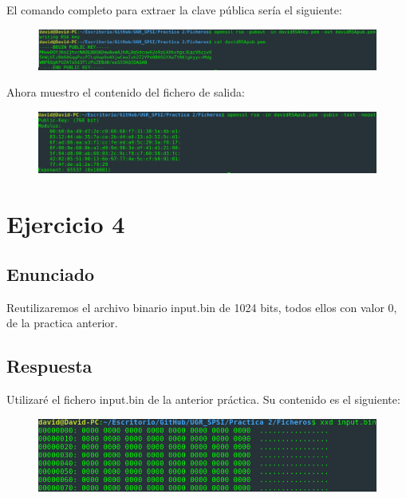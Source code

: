 \documentclass[10pt,a4paper,spanish]{report}
\begin{document}
\noindent
El comando completo para extraer la clave pública sería el siguiente:

\begin{figure}[!hbp]
 \centering  \includegraphics[width=1\textwidth]{./Imagenes/3_0.png}
\end{figure}

\noindent
Ahora muestro el contenido del fichero de salida:

\begin{figure}[!hbp]
 \centering  \includegraphics[width=1\textwidth]{./Imagenes/3_1.png}
\end{figure}


\chapter{Ejercicio 4}

\section{Enunciado}
\noindent
Reutilizaremos el archivo binario input.bin de 1024 bits, todos ellos con valor 0, de la practica anterior.

\section{Respuesta}
\noindent
Utilizaré el fichero input.bin de la anterior práctica. Su contenido es el siguiente:

\begin{figure}[!hbp]
 \centering  \includegraphics[width=1\textwidth]{./Imagenes/4.png}
\end{figure}
\end{document}
